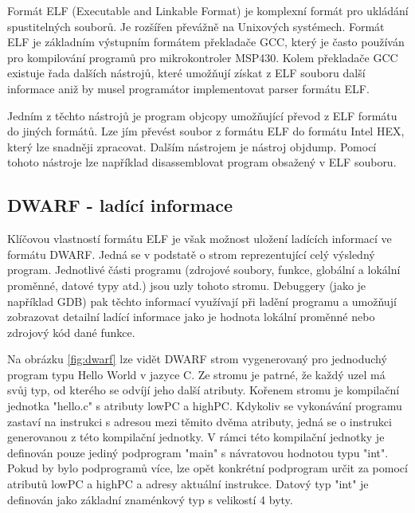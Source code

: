 Formát ELF (Executable and Linkable Format) je komplexní formát pro ukládání spustitelných souborů. Je rozšířen převážně na Unixových systémech. Formát ELF je základním výstupním formátem překladače GCC, který je často používán pro kompilování programů pro mikrokontroler MSP430. Kolem překladače GCC existuje řada dalších nástrojů, které umožňují získat z ELF souboru další informace aniž by musel programátor implementovat parser formátu ELF.

Jedním z těchto nástrojů je program objcopy umožňující převod z ELF formátu do jiných formátů. Lze jím převést soubor z formátu ELF do formátu Intel HEX, který lze snadněji zpracovat. Dalším nástrojem je nástroj objdump. Pomocí tohoto nástroje lze například disassemblovat program obsažený v ELF souboru.

\subsection{DWARF - ladící informace}

Klíčovou vlastností formátu ELF je však možnost uložení ladících informací ve formátu DWARF. Jedná se v podstatě o strom reprezentující celý výsledný
program. Jednotlivé části programu (zdrojové soubory, funkce, globální a lokální proměnné, datové typy atd.) jsou uzly tohoto stromu. Debuggery (jako je například GDB) pak těchto informací využívají při ladění programu a umožňují zobrazovat detailní ladící informace jako je hodnota lokální proměnné nebo zdrojový kód dané funkce.

Na obrázku \ref{fig:dwarf} lze vidět DWARF strom vygenerovaný pro jednoduchý program typu Hello World v jazyce C. Ze stromu je patrné, že každý uzel má svůj typ, od kterého se odvíjí jeho další atributy. Kořenem stromu je kompilační jednotka "hello.c" s atributy lowPC a highPC. Kdykoliv se vykonávání programu zastaví na instrukci s adresou mezi těmito dvěma atributy, jedná se o instrukci generovanou z této kompilační jednotky. V rámci této kompilační jednotky je definován pouze jediný podprogram "main" s návratovou hodnotou typu "int". Pokud by bylo podprogramů více, lze opět konkrétní podprogram určit za pomocí atributů lowPC a highPC a adresy aktuální instrukce. Datový typ "int" je definován jako základní znaménkový typ s velikostí 4 byty.

